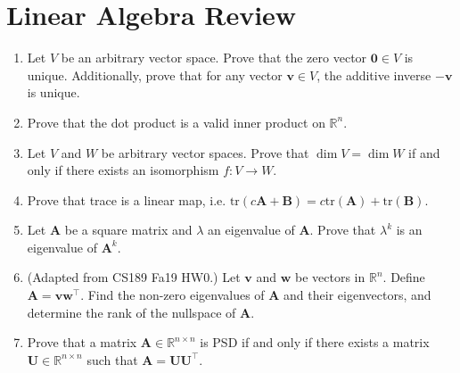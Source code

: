 \documentclass{article}
\begin{document}
\section{Linear Algebra Review}
\begin{enumerate}[label=\arabic*.]
\item Let $V$ be an arbitrary vector space. Prove that the zero vector $\mathbf{0} \in V$ is unique. Additionally, prove that for any vector $\mathbf{v} \in V$, the additive inverse $-\mathbf{v}$ is unique. 
\item Prove that the dot product is a valid inner product on $\mathbb{R}^n$.
\item Let $V$ and $W$ be arbitrary vector spaces. Prove that $\dim V = \dim W$ if and only if there exists an isomorphism $f: V \rightarrow W$.
\item Prove that trace is a linear map, i.e. $\text{tr}(c\mathbf{A + B}) = c\text{tr}(\mathbf{A}) + \text{tr}(\mathbf{B})$.
\item Let $\mathbf{A}$ be a square matrix and $\lambda$ an eigenvalue of $\mathbf{A}$. Prove that $\lambda^k$ is an eigenvalue of $\mathbf{A}^k$.
\item (Adapted from CS189 Fa19 HW0.) Let $\mathbf{v}$ and $\mathbf{w}$ be vectors in $\mathbb{R}^n$. Define $\mathbf{A} = \mathbf{vw^{\top}}$. Find the non-zero eigenvalues of $\mathbf{A}$ and their eigenvectors, and determine the rank of the nullspace of $\mathbf{A}$.
\item Prove that a matrix $\mathbf{A} \in \mathbb{R}^{n \times n}$ is PSD if and only if there exists a matrix $\mathbf{U} \in \mathbb{R}^{n \times n}$ such that $\mathbf{A} = \mathbf{UU^{\top}}$.
\end{enumerate}
\end{document}
